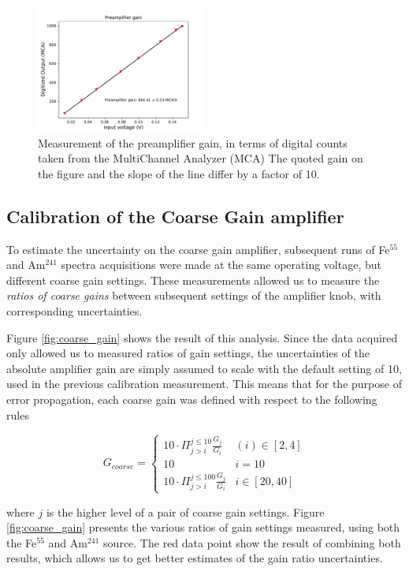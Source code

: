 \begin{figure}[H]
  \includegraphics[scale=0.5,width=0.5\textwidth]{graphics/preamp_gain_calibration_plus_conversionfactor.pdf}
  \caption{Measurement of the preamplifier gain, in terms of digital counts taken from the MultiChannel Analyzer (MCA) The quoted gain on the figure and the slope of the line differ by a factor of 10.}
  \label{fig:preamp_gain_mca}
\end{figure}


\subsection{Calibration of the Coarse Gain amplifier}
\label{sec:coarse}
To estimate the uncertainty on the coarse gain amplifier, subsequent runs of Fe$^{55}$ and Am$^{241}$ spectra acquisitions were made at the same operating voltage, but different coarse gain settings. These measurements allowed us to measure the \textit{ratios of coarse gains} between subsequent settings of the amplifier knob, with corresponding uncertainties.

Figure \ref{fig:coarse_gain} shows the result of this analysis. Since the data acquired only allowed us to measured ratios of gain settings, the uncertainties of the absolute amplifier gain are simply assumed to scale with the default setting of 10, used in the previous calibration measurement. This means that for the purpose of error propagation, each coarse gain was defined with respect to the following rules

$$
G_{coarse} = \left\{
\begin{array}{ll} 
  10\cdot\Pi_{j>i}^{j\leq10}\frac{G_{j}}{G_{i}} & (i) \in [2,4] \\
  10 & i=10 \\
  10\cdot\Pi_{j>i}^{j\leq 100}\frac{G_{j}}{G_{i}} & i \in [20,40] 
\end{array}
\right.
$$

where $j$ is the higher level of a pair of coarse gain settings. Figure \ref{fig:coarse_gain} presents the various ratios of gain settings measured, using both the Fe$^{55}$ and Am$^{241}$ source. The red data point show the result of combining both results, which allows us to get better estimates of the gain ratio uncertainties.

